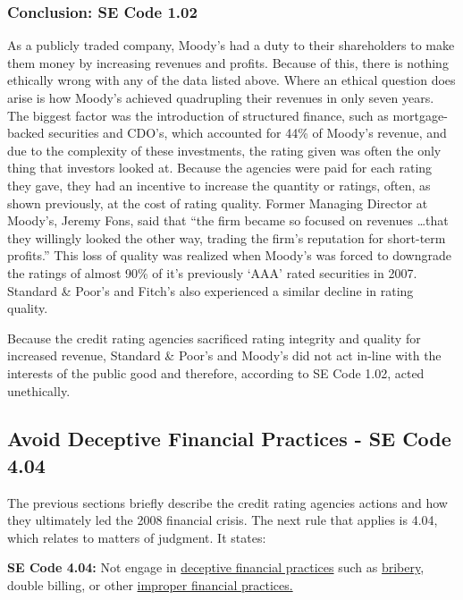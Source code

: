 \documentclass[11pt]{article}
\begin{document}
\begin{multicols}{2}
\subsubsection{Conclusion: SE Code 1.02}

As a publicly traded company, Moody's had a duty to their shareholders to make them money by increasing revenues and profits. Because of this, there is nothing ethically wrong with any of the data listed above.  Where an ethical question does arise is how Moody's achieved quadrupling their revenues in only seven years.  The biggest factor was the introduction of structured finance, such as mortgage-backed securities and CDO's, which accounted for 44\% of Moody's revenue, and due to the complexity of these investments, the rating given was often the only thing that investors looked at. \cite[p.149]{govtReport}  Because the agencies were paid for each rating they gave, they had an incentive to increase the quantity or ratings, often, as shown previously, at the cost of rating quality.  Former Managing Director at Moody's, Jeremy Fons, said that ``the firm became so focused on revenues \ldots that they willingly looked the other way, trading the firm's reputation for short-term profits.'' \cite[p.207]{govtReport} This loss of quality was realized when Moody's was forced to downgrade the ratings of almost 90\% of it's previously `AAA' rated securities in 2007.  Standard \& Poor's and Fitch's also experienced a similar decline in rating quality. \cite[p.212]{govtReport} 

Because the credit rating agencies sacrificed rating integrity and quality for increased revenue, Standard \& Poor's and Moody's did not act in-line with the interests of the public good and therefore, according to SE Code 1.02, acted unethically.


\subsection{Avoid Deceptive Financial Practices - SE Code 4.04}

The previous sections briefly describe the credit rating agencies actions and how they ultimately led the 2008 financial crisis.  The next rule that applies is 4.04, which relates to matters of judgment.  It states:

\begin{framed}
\noindent
   \textbf{SE Code 4.04: } 
   \newline
   [Do] Not engage in \underline{deceptive financial practices} such as \underline{bribery}, double billing, or other \underline{improper financial practices.} \cite{SEcode}
\end{framed}


\end{multicols}
\end{document}
